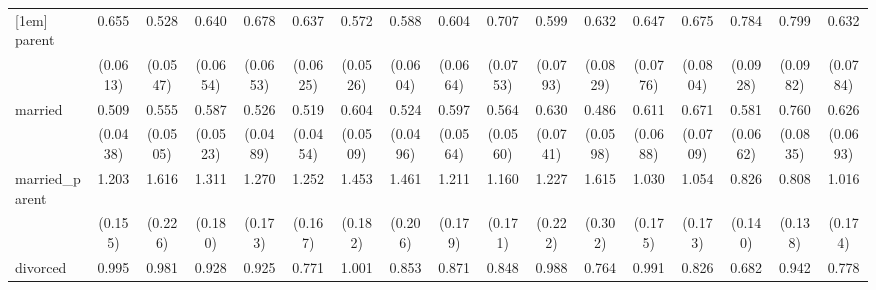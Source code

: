 {\begin{tabular}{l*{16}{c}}
[1em]
parent              &       0.655\sym{***}&       0.528\sym{***}&       0.640\sym{***}&       0.678\sym{***}&       0.637\sym{***}&       0.572\sym{***}&       0.588\sym{***}&       0.604\sym{***}&       0.707\sym{**} &       0.599\sym{***}&       0.632\sym{***}&       0.647\sym{***}&       0.675\sym{***}&       0.784\sym{*}  &       0.799         &       0.632\sym{***}\\
                    &    (0.0613)         &    (0.0547)         &    (0.0654)         &    (0.0653)         &    (0.0625)         &    (0.0526)         &    (0.0604)         &    (0.0664)         &    (0.0753)         &    (0.0793)         &    (0.0829)         &    (0.0776)         &    (0.0804)         &    (0.0928)         &    (0.0982)         &    (0.0784)         \\
[1em]
married             &       0.509\sym{***}&       0.555\sym{***}&       0.587\sym{***}&       0.526\sym{***}&       0.519\sym{***}&       0.604\sym{***}&       0.524\sym{***}&       0.597\sym{***}&       0.564\sym{***}&       0.630\sym{***}&       0.486\sym{***}&       0.611\sym{***}&       0.671\sym{***}&       0.581\sym{***}&       0.760\sym{*}  &       0.626\sym{***}\\
                    &    (0.0438)         &    (0.0505)         &    (0.0523)         &    (0.0489)         &    (0.0454)         &    (0.0509)         &    (0.0496)         &    (0.0564)         &    (0.0560)         &    (0.0741)         &    (0.0598)         &    (0.0688)         &    (0.0709)         &    (0.0662)         &    (0.0835)         &    (0.0693)         \\
[1em]
married\_parent      &       1.203         &       1.616\sym{***}&       1.311\sym{*}  &       1.270         &       1.252         &       1.453\sym{**} &       1.461\sym{**} &       1.211         &       1.160         &       1.227         &       1.615\sym{*}  &       1.030         &       1.054         &       0.826         &       0.808         &       1.016         \\
                    &     (0.155)         &     (0.226)         &     (0.180)         &     (0.173)         &     (0.167)         &     (0.182)         &     (0.206)         &     (0.179)         &     (0.171)         &     (0.222)         &     (0.302)         &     (0.175)         &     (0.173)         &     (0.140)         &     (0.138)         &     (0.174)         \\
[1em]
divorced            &       0.995         &       0.981         &       0.928         &       0.925         &       0.771\sym{*}  &       1.001         &       0.853         &       0.871         &       0.848         &       0.988         &       0.764         &       0.991         &       0.826         &       0.682\sym{**} &       0.942         &       0.778         \\

\end{tabular}}
